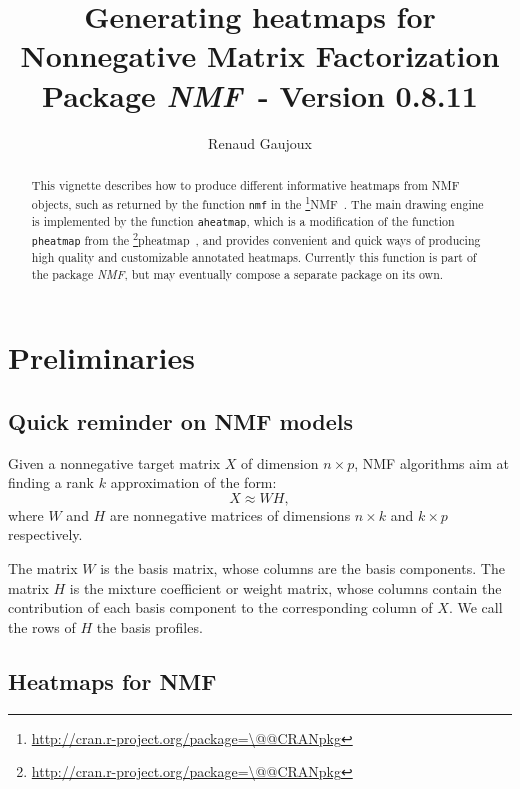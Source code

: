 \documentclass[a4paper]{article}\usepackage{graphicx, color}
\makeatletter
\let\code=\texttt
\newcommand{\pkgname}[1]{\textit{#1}\xspace}
\newcommand{\CRANurl}[1]{\url{http://cran.r-project.org/package=#1}}
\def\CRANpkg{\@ifstar\@CRANpkg\@@CRANpkg}
\def\@CRANpkg#1{\href{http://cran.r-project.org/package=#1}{\pkgname{#1}}\footnote{\CRANurl{#1}}}
\def\@@CRANpkg#1{\href{http://cran.r-project.org/package=#1}{\pkgname{#1}} package\footnote{\CRANurl{#1}}}
\newcommand{\citeCRANpkg}[1]{\CRANpkg{#1}~\cite{#1}}
\newcommand{\nmfpack}{\pkgname{NMF}}
\makeatother
\begin{document}
\title{Generating heatmaps for Nonnegative Matrix Factorization\\
\small Package \nmfpack\ - Version 0.8.11}
\author{Renaud Gaujoux}

\maketitle

\begin{abstract}
This vignette describes how to produce different informative heatmaps from NMF objects, 
such as returned by the function \code{nmf} in the \citeCRANpkg{NMF}.
The main drawing engine is implemented by the function \code{aheatmap}, which is 
a modification of the function \code{pheatmap} from the \citeCRANpkg{pheatmap},
and provides convenient and quick ways of producing high quality and customizable annotated heatmaps.
Currently this function is part of the package \nmfpack, but may eventually 
compose a separate package on its own.
\end{abstract}

{\small \tableofcontents}

\section{Preliminaries}

\subsection{Quick reminder on NMF models}

Given a nonnegative target matrix $X$ of dimension $n\times p$, NMF algorithms 
aim at finding a rank $k$ approximation of the form:
$$
X \approx W H,
$$
where $W$ and $H$ are nonnegative matrices of dimensions $n\times k$ and $k\times p$ 
respectively.

The matrix $W$ is the basis matrix, whose columns are the basis components.
The matrix $H$ is the mixture coefficient or weight matrix, whose columns contain 
the contribution of each basis component to the corresponding column of $X$.
We call the rows of $H$ the basis profiles.

\subsection{Heatmaps for NMF}
\end{document}
